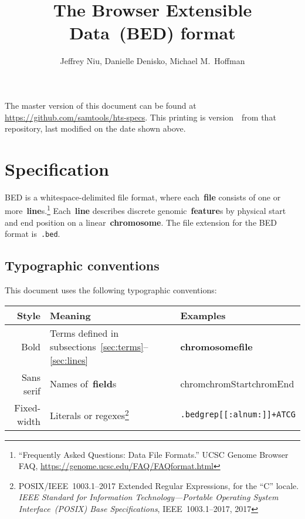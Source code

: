 \documentclass[11pt]{article}
\title{The Browser Extensible Data~(BED) format}
\author{Jeffrey Niu, Danielle Denisko, Michael M.~Hoffman}
\date{\headdate}
\providecommand*{\Ac}[1]{\ac{#1}} %
\begin{document}
\maketitle

\begin{small}
\noindent
The master version of this document can be found at \url{https://github.com/samtools/hts-specs}.
This printing is version~\commitdesc\ from that repository, last modified on the date shown above.
\end{small}


\section{Specification}

\Ac{BED} is a whitespace-delimited file format, where each~\textbf{file} consists of one or more~\textbf{line}s.\footnote{``Frequently Asked Questions: Data File Formats.'' \ac{UCSC} Genome Browser FAQ, \url{https://genome.ucsc.edu/FAQ/FAQformat.html}}
Each~\textbf{line} describes discrete genomic~\textbf{feature}s by physical start and end position on a linear~\textbf{chromosome}.
The file extension for the \ac{BED} format is~\texttt{.bed}.

\subsection{Typographic conventions}

This document uses the following typographic conventions:

\vspace{2ex}

\noindent
\begin{tabularx}{\textwidth}{r L L}
  \toprule
  Style & Meaning & Examples \\
  \midrule
  Bold & Terms defined in subsections~\ref{sec:terms}--\ref{sec:lines} & \textbf{chromosome}{\quad}\textbf{file} \\
  Sans serif & Names of~\textbf{field}s & \textsf{chrom}{\quad}\textsf{chromStart}{\quad}\textsf{chromEnd} \\
  Fixed-width & Literals or \ac{regex}es\footnote{POSIX/IEEE~1003.1--2017 Extended Regular Expressions, for the ``C'' locale.
                \emph{IEEE Standard for Information Technology---Portable Operating System Interface~(POSIX) Base Specifications}, IEEE~1003.1--2017, 2017} & \texttt{.bed}{\quad}\texttt{grep}{\quad}\texttt{[[:alnum:]]+}{\quad}\texttt{ATCG} \\
  \bottomrule
\end{tabularx}
\end{document}

